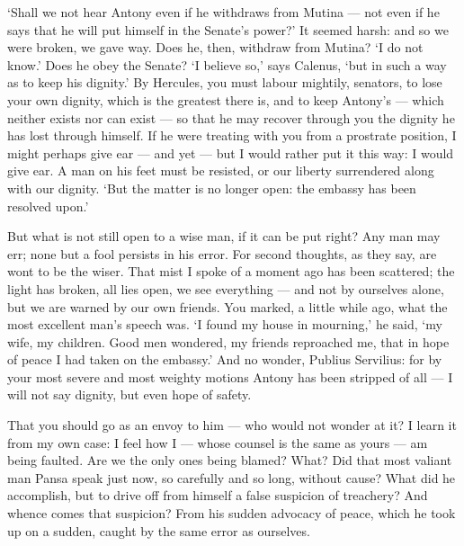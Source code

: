  `Shall we not hear Antony even if he withdraws from Mutina --- not even if he says that he will put himself in the Senate's power?' It seemed harsh: and so we were broken, we gave way. Does he, then, withdraw from Mutina? `I do not know.' Does he obey the Senate? `I believe so,' says Calenus, `but in such a way as to keep his dignity.' By Hercules, you must labour mightily, senators, to lose your own dignity, which is the greatest there is, and to keep Antony's --- which neither exists nor can exist --- so that he may recover through you the dignity he has lost through himself. If he were treating with you from a prostrate position, I might perhaps give ear --- and yet --- but I would rather put it this way: I would give ear. A man on his feet must be resisted, or our liberty surrendered along with our dignity. `But the matter is no longer open: the embassy has been resolved upon.'

 But what is not still open to a wise man, if it can be put right? Any man may err; none but a fool persists in his error. For second thoughts, as they say, are wont to be the wiser. That mist I spoke of a moment ago has been scattered; the light has broken, all lies open, we see everything --- and not by ourselves alone, but we are warned by our own friends. You marked, a little while ago, what the most excellent man's speech was. `I found my house in mourning,' he said, `my wife, my children. Good men wondered, my friends reproached me, that in hope of peace I had taken on the embassy.' And no wonder, Publius Servilius: for by your most severe and most weighty motions Antony has been stripped of all --- I will not say dignity, but even hope of safety.

 That you should go as an envoy to him --- who would not wonder at it? I learn it from my own case: I feel how I --- whose counsel is the same as yours --- am being faulted. Are we the only ones being blamed? What? Did that most valiant man Pansa speak just now, so carefully and so long, without cause? What did he accomplish, but to drive off from himself a false suspicion of treachery? And whence comes that suspicion? From his sudden advocacy of peace, which he took up on a sudden, caught by the same error as ourselves.

